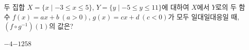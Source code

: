 \hspace*{2mm}\begin{minipage}[t]{\dimexpr\linewidth-2mm\relax}\vspace{0pt}
두 집합 $X=\{x \mid -3\le x\le 5\}$, $Y=\{y \mid -5\le y\le 11\}$에 대하여 $X$에서 $Y$로의 두 함수 $f(x)=ax+b\ (a>0)$, $g(x)=cx+d\ (c<0)$가 모두 일대일대응일 때, $(f\circ g^{-1})(1)$의 값은? 
\begin{choices32}{$-4$}{$-1$}{$2$}{$5$}{$8$}\end{choices32}\end{minipage}
